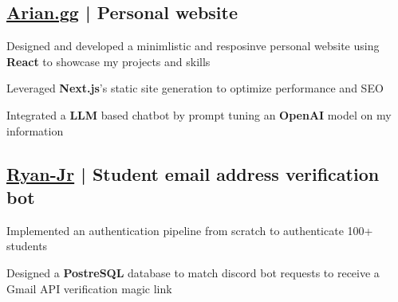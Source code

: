


\subsection{\href{https://arian.gg}{Arian.gg} | Personal website }
\begin{zitemize}
    \item Designed and developed a minimlistic and resposinve personal website using \textbf{React} to showcase my projects and skills
    \item Leveraged \textbf{Next.js}'s static site generation to optimize performance and SEO
    \item Integrated a \textbf{LLM} based chatbot by prompt tuning an \textbf{OpenAI} model on my information

\end{zitemize}

\vspace{0.3cm}\subsection{\href{https://github.com/arian81/Ryan-Jr}{Ryan-Jr} | Student email address verification bot }
\begin{zitemize}
    \item Implemented an authentication pipeline from scratch to authenticate 100+ students
    \item Designed a \textbf{PostreSQL} database to match discord bot requests to receive a Gmail API verification magic link
\end{zitemize}